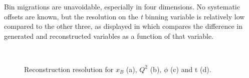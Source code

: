     Bin migrations are unavoidable, especially in four dimensions. No systematic offsets are known, but the resolution on the \textit{t} binning variable is relatively low compared to the other three, as displayed in  which compares the difference in generated and reconstructed variables as a function of that variable. 
    
    \begin{figure}[H]
        \centering
        \hfill
        \\
        \hfill
        \caption[Binning Variable Resolutions]{Reconstruction resolution for $x_B$ (a), $Q^2$ (b), $\phi$ (c) and t (d).}
        \label{fig:binning_resolutions}
    \end{figure}
    
